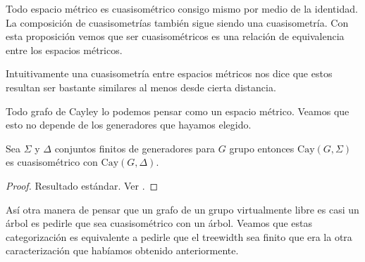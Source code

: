 \documentclass[tesis.tex]{subfiles}
\begin{document}
Todo espacio métrico es cuasisométrico consigo mismo por medio de la identidad.
La composición de cuasisometrías también sigue siendo una cuasisometría.
Con esta proposición vemos que ser cuasisométricos es una relación de equivalencia entre los espacios métricos. 


Intuitivamente una cuasisometría entre espacios métricos nos dice que estos resultan ser bastante similares al menos desde cierta distancia. 
\medskip
\begin{ej}
\end{ej}

Todo grafo de Cayley lo podemos pensar como un espacio métrico.  
Veamos que esto no depende de los generadores que hayamos elegido.

\begin{prop}
	Sea $\Sigma$ y $\Delta$ conjuntos finitos de generadores para $G$ grupo entonces $\text{Cay}(G,\Sigma)$ es cuasisométrico con $\text{Cay}(G, \Delta).$
\end{prop}

\begin{proof}
	Resultado estándar. Ver \cite{bridson2013metric}.
\end{proof}



Así otra manera de pensar que un grafo de un grupo virtualmente libre es casi un árbol es pedirle que sea cuasisométrico con un árbol. 
Veamos que estas categorización es equivalente a pedirle que el treewidth sea finito que era la otra caracterización que habíamos obtenido anteriormente.
\end{document}
